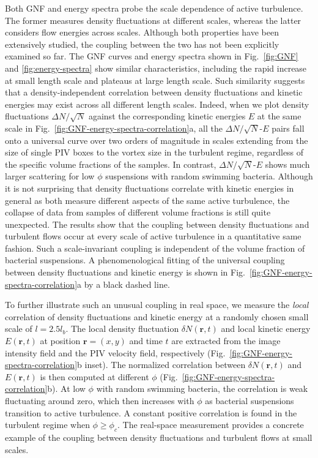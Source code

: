 Both GNF and energy spectra probe the scale dependence of active turbulence. The former measures density fluctuations at different scales, whereas the latter considers flow energies across scales. Although both properties have been extensively studied, the coupling between the two has not been explicitly examined so far.
The GNF curves and energy spectra shown in Fig.~\ref{fig:GNF} and \ref{fig:energy-spectra} show similar characteristics, including the rapid increase at small length scale and plateaus at large length scale. Such similarity suggests that a density-independent correlation between density fluctuations and kinetic energies may exist across all different length scales.
Indeed, when we plot density fluctuations $\Delta N/\sqrt N$ against the corresponding kinetic energies $E$ at the same scale in Fig.~\ref{fig:GNF-energy-spectra-correlation}a, all the $\Delta N/\sqrt N$-$E$ pairs fall onto a universal curve over two orders of magnitude in scales extending from the size of single PIV boxes to the vortex size in the turbulent regime, regardless of the specific volume fractions of the samples.
In contrast, $\Delta N/\sqrt N$-$E$ shows much larger scattering for low $\phi$ suspensions with random swimming bacteria.
Although it is not surprising that density fluctuations correlate with kinetic energies in general as both measure different aspects of the same active turbulence, the collapse of data from samples of different volume fractions is still quite unexpected.
The results show that the coupling between density fluctuations and turbulent flows occur at every scale of active turbulence in a quantitative same fashion. Such a scale-invariant coupling is independent of the volume fraction of bacterial suspensions. A phenomenological fitting of the universal coupling between density fluctuations and kinetic energy is shown in Fig.~\ref{fig:GNF-energy-spectra-correlation}a by a black dashed line.

To further illustrate such an unusual coupling in real space, we measure the \emph{local} correlation of density fluctuations and kinetic energy at a randomly chosen small scale of $l = 2.5l_b$. The local density fluctuation $\delta N(\mathbf{r},t)$ and local kinetic energy $E(\mathbf{r},t)$ at position $\mathbf{r} = (x,y)$ and time $t$ are extracted from the image intensity field and the PIV velocity field, respectively (Fig.~\ref{fig:GNF-energy-spectra-correlation}b inset).
The normalized correlation between $\delta N(\mathbf{r},t)$ and $E(\mathbf{r},t)$ is then computed at different $\phi$ (Fig.~\ref{fig:GNF-energy-spectra-correlation}b). At low $\phi$ with random swimming bacteria, the correlation is weak fluctuating around zero, which then increases with $\phi$ as bacterial suspensions transition to active turbulence. A constant positive correlation is found in the turbulent regime when $\phi \geq \phi_c$. The real-space measurement provides a concrete example of the coupling between density fluctuations and turbulent flows at small scales.

